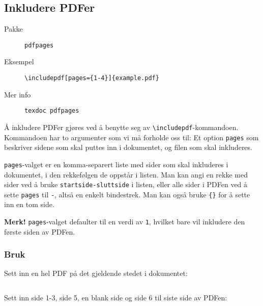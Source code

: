 \subsection{Inkludere PDFer}
\label{pkg:pdfpages}
\begin{description}
    \item[Pakke] \texttt{pdfpages}
    \item[Eksempel] \texttt{\textbackslash includepdf[pages=\{1-4\}]\{example.pdf\}}
    \item[Mer info] \texttt{texdoc pdfpages}
\end{description}

Å inkludere PDFer gjøres ved å benytte seg av \texttt{\textbackslash includepdf}-kommandoen.
Kommandoen har to argumenter som vi må forholde oss til: Et option \texttt{pages} som beskriver sidene som skal puttes inn i dokumentet, og filen som skal inkluderes.

\texttt{pages}-valget er en komma-separert liste med sider som skal inkluderes i dokumentet, i den rekkefølgen de oppstår i listen.
Man kan angi en rekke med sider ved å bruke \texttt{startside-sluttside} i listen, eller alle sider i PDFen ved å sette \texttt{pages} til \texttt{-}, altså en enkelt bindestrek.
Man kan også bruke \texttt{\{\}} for å sette inn en tom side.

\textbf{Merk!} \texttt{pages}-valget defaulter til en verdi av \texttt{1}, hvilket bare vil inkludere den første siden av PDFen.

\subsubsection*{Bruk}
Sett inn en hel PDF på det gjeldende stedet i dokumentet:
\vspace{0.75em}
\begin{lstlisting}

\end{lstlisting}
\vspace{1.5em}

Sett inn side 1-3, side 5, en blank side og side 6 til siste side av PDFen:
\vspace{0.75em}
\begin{lstlisting}

\end{lstlisting}
\vspace{1.5em}